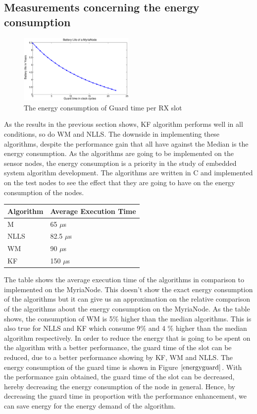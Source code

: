 \documentclass[journal]{IEEEtran}
\begin{document}
\subsection{\textbf{Measurements concerning the energy consumption}}
\begin{figure}[b]
\includegraphics[width=0.5\textwidth]{guardsave}
\caption{The energy consumption of Guard time per RX slot}
\label{energyguard}
\end{figure}
As the results in the previous section shows, KF algorithm performs
well in all conditions, so do WM and NLLS. The downside in
implementing these algorithms, despite the performance gain that all
have against the Median is the energy consumption. As the algorithms
are going to be implemented on the sensor nodes, the energy
consumption is a priority in the study of embedded system algorithm
development. The algorithms are written in C and implemented on the
test nodes to see the effect that they are going to have on the
energy consumption of the nodes.
\begin{center}
    \begin{tabular}{ |p{2cm} | p{2.75cm} |}
    \hline
    Algorithm & Average Execution Time \\ \hline
    M &  65 $\mu$s \\ \hline
    NLLS & 82.5 $\mu$s \\ \hline
    WM &   90 $\mu$s \\ \hline
    KF &  150 $\mu$s  \\ \hline
    \end{tabular}
\label{tab}
\end{center}
The table shows the average execution time of the algorithms in
comparison to implemented on the MyriaNode. This doesn't show the
exact energy consumption of the algorithms but it can give us an
approximation on the relative comparison of the algorithms about the
energy consumption on the MyriaNode. As the table shows, the
consumption of WM is 5$\%$ higher than the median algorithms. This
is also true for NLLS and KF which consume 9$\%$ and 4 $\%$ higher
than the median algorithm respectively. \newline
In order to reduce the energy that is going to be spent on the algorithm with
a better performance, the guard time of the slot can be reduced, due
to a better performance showing by KF, WM and NLLS. The energy
consumption of the guard time is shown in Figure $\ref{energyguard}$.
\newline 
With the performance gain obtained, the guard time of the slot
can be decreased, hereby decreasing the energy consumption of the
node in general. Hence, by decreasing the guard time in proportion with the
performance enhancement, we can save energy for the energy demand of
the algorithm.
\end{document}
